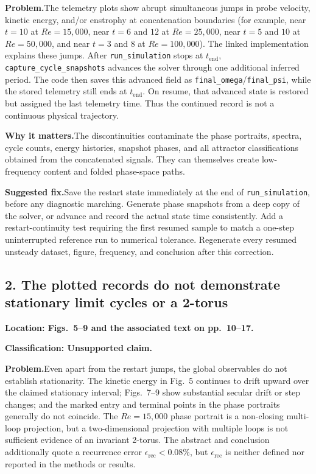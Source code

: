 \documentclass[11pt]{article}
\newcommand{\classification}[1]{\par\noindent\textbf{Classification: #1.}\par}
\newcommand{\location}[1]{\textbf{Location: #1}}
\newcommand{\problem}{\noindent\textbf{Problem.}\hspace{0.35em}}
\newcommand{\importance}{\par\noindent\textbf{Why it matters.}\hspace{0.35em}}
\newcommand{\fix}{\par\noindent\textbf{Suggested fix.}\hspace{0.35em}}
\begin{document}
\problem The telemetry plots show abrupt simultaneous jumps in probe velocity, kinetic energy, and/or enstrophy at concatenation boundaries (for example, near $t=10$ at $Re=15{,}000$, near $t=6$ and $12$ at $Re=25{,}000$, near $t=5$ and $10$ at $Re=50{,}000$, and near $t=3$ and $8$ at $Re=100{,}000$).  The linked implementation explains these jumps.  After \texttt{run\_simulation} stops at $t_{\mathrm{end}}$, \texttt{capture\_cycle\_snapshots} advances the solver through one additional inferred period.  The code then saves this advanced field as \texttt{final\_omega}/\texttt{final\_psi}, while the stored telemetry still ends at $t_{\mathrm{end}}$.  On resume, that advanced state is restored but assigned the last telemetry time.  Thus the continued record is not a continuous physical trajectory.

\importance The discontinuities contaminate the phase portraits, spectra, cycle counts, energy histories, snapshot phases, and all attractor classifications obtained from the concatenated signals.  They can themselves create low-frequency content and folded phase-space paths.

\fix Save the restart state immediately at the end of \texttt{run\_simulation}, before any diagnostic marching.  Generate phase snapshots from a deep copy of the solver, or advance and record the actual state time consistently.  Add a restart-continuity test requiring the first resumed sample to match a one-step uninterrupted reference run to numerical tolerance.  Regenerate every resumed unsteady dataset, figure, frequency, and conclusion after this correction.

\subsection*{2. The plotted records do not demonstrate stationary limit cycles or a 2-torus}

\location{Figs.~5--9 and the associated text on pp.~10--17.}

\classification{Unsupported claim}

\problem Even apart from the restart jumps, the global observables do not establish stationarity.  The kinetic energy in Fig.~5 continues to drift upward over the claimed stationary interval; Figs.~7--9 show substantial secular drift or step changes; and the marked entry and terminal points in the phase portraits generally do not coincide.  The $Re=15{,}000$ phase portrait is a non-closing multi-loop projection, but a two-dimensional projection with multiple loops is not sufficient evidence of an invariant 2-torus.  The abstract and conclusion additionally quote a recurrence error $\epsilon_{\mathrm{rec}}<0.08\%$, but $\epsilon_{\mathrm{rec}}$ is neither defined nor reported in the methods or results.
\end{document}
